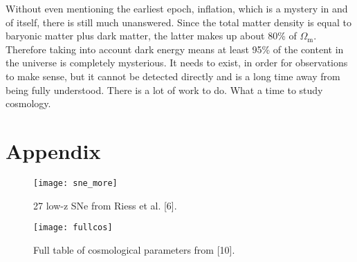 \documentclass[12pt]{article}
\begin{document}
Without even mentioning the earliest epoch, inflation, which is a mystery in and of itself, there is still much unanswered. Since the total matter density is equal to baryonic matter plus dark matter, the latter makes up about 80\% of $\Omega_\text{m}$. Therefore taking into account dark energy means at least 95\% of the content in the universe is completely mysterious. It needs to exist, in order for observations to make sense, but it cannot be detected directly and is a long time away from being fully understood. There is a lot of work to do. What a time to study cosmology. 

\newpage	
\section{Appendix}
\begin{figure}[h]
    \centering
    \texttt{[image: sne\_more]}
    \caption{27 low-z SNe from Riess et al. [6].}
    \label{fig:mesh1}
\end{figure}


\begin{figure}[h]
    \centering
    \texttt{[image: fullcos]}
    \caption{Full table of cosmological parameters from [10].}
    \label{fig:mesh1}
\end{figure}
	\newpage	
\end{document}
